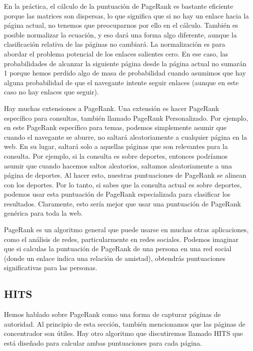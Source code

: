 En la práctica, el cálculo de la puntuación de PageRank es bastante eficiente porque las matrices son dispersas, lo que significa que si no hay un enlace hacia la página actual, no tenemos que preocuparnos por ello en el cálculo. También es posible normalizar la ecuación, y eso dará una forma algo diferente, aunque la clasificación relativa de las páginas no cambiará. La normalización es para abordar el problema potencial de los enlaces salientes cero. En ese caso, las probabilidades de alcanzar la siguiente página desde la página actual no sumarán 1 porque hemos perdido algo de masa de probabilidad cuando asumimos que hay alguna probabilidad de que el navegante intente seguir enlaces (aunque en este caso no hay enlaces que seguir).

Hay muchas extensiones a PageRank. Una extensión es hacer PageRank específico para consultas, también llamado PageRank Personalizado. Por ejemplo, en este PageRank específico para temas, podemos simplemente asumir que cuando el navegante se aburre, no saltará aleatoriamente a cualquier página en la web. En su lugar, saltará solo a aquellas páginas que son relevantes para la consulta. Por ejemplo, si la consulta es sobre deportes, entonces podríamos asumir que cuando hacemos saltos aleatorios, saltamos aleatoriamente a una página de deportes. Al hacer esto, nuestras puntuaciones de PageRank se alinean con los deportes. Por lo tanto, si sabes que la consulta actual es sobre deportes, podemos usar esta puntuación de PageRank especializada para clasificar los resultados. Claramente, esto sería mejor que usar una puntuación de PageRank genérica para toda la web.

PageRank es un algoritmo general que puede usarse en muchas otras aplicaciones, como el análisis de redes, particularmente en redes sociales. Podemos imaginar que si calculas la puntuación de PageRank de una persona en una red social (donde un enlace indica una relación de amistad), obtendrás puntuaciones significativas para las personas.

\subsection{HITS}
Hemos hablado sobre PageRank como una forma de capturar páginas de autoridad. Al principio de esta sección, también mencionamos que las páginas de concentrador son útiles. Hay otro algoritmo que discutiremos llamado HITS que está diseñado para calcular ambas puntuaciones para cada página.


